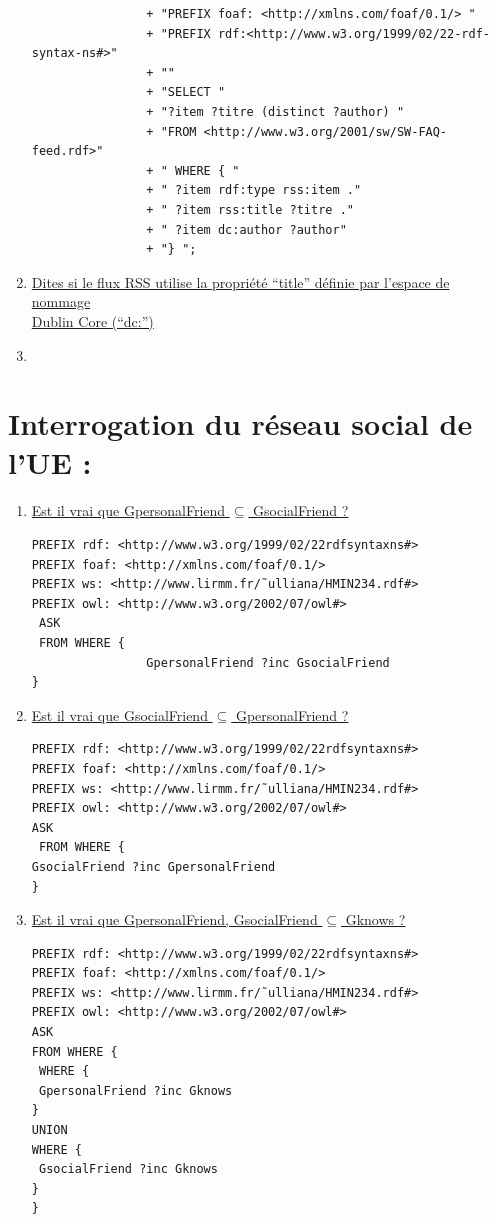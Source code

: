 \documentclass[12pt,a4paper]{article}
\begin{document}
\begin{justify}
\begin{enumerate}
\begin{verbatim}
                + "PREFIX foaf: <http://xmlns.com/foaf/0.1/> "
                + "PREFIX rdf:<http://www.w3.org/1999/02/22-rdf-syntax-ns#>"
                + ""
                + "SELECT "
                + "?item ?titre (distinct ?author) "
                + "FROM <http://www.w3.org/2001/sw/SW-FAQ-feed.rdf>"
                + " WHERE { "
                + " ?item rdf:type rss:item ."
                + " ?item rss:title ?titre ."
                + " ?item dc:author ?author"
                + "} ";
            \end{verbatim}
            \item  \underline{Dites si le flux RSS utilise la propri\'et\'e “title” d\'efinie par l\rq{espace} de nommage}\\ \underline{ Dublin Core (“dc:”)} \\


            \item
        \end{enumerate}
    \end{justify}


    \section{Interrogation du réseau social de l'UE :}
    \begin{justify}
        \begin{enumerate}
            \item \underline{Est il vrai que GpersonalFriend $\subseteq$ GsocialFriend ?}
            \begin{verbatim}
PREFIX rdf: <http://www.w3.org/1999/02/22rdfsyntaxns#>
PREFIX foaf: <http://xmlns.com/foaf/0.1/> 
PREFIX ws: <http://www.lirmm.fr/˜ulliana/HMIN234.rdf#> 
PREFIX owl: <http://www.w3.org/2002/07/owl#>
 ASK
 FROM WHERE {
                GpersonalFriend ?inc GsocialFriend 
}

            \end{verbatim}
            \item \underline{Est il vrai que GsocialFriend $\subseteq$ GpersonalFriend ?}
            \begin{verbatim}
PREFIX rdf: <http://www.w3.org/1999/02/22rdfsyntaxns#>
PREFIX foaf: <http://xmlns.com/foaf/0.1/> 
PREFIX ws: <http://www.lirmm.fr/˜ulliana/HMIN234.rdf#> 
PREFIX owl: <http://www.w3.org/2002/07/owl#>
ASK
 FROM WHERE { 
GsocialFriend ?inc GpersonalFriend 
}
            \end{verbatim}
            \item \underline{Est il vrai que GpersonalFriend, GsocialFriend $\subseteq$ Gknows ?}
            \begin{verbatim}
PREFIX rdf: <http://www.w3.org/1999/02/22rdfsyntaxns#>
PREFIX foaf: <http://xmlns.com/foaf/0.1/>
PREFIX ws: <http://www.lirmm.fr/˜ulliana/HMIN234.rdf#>
PREFIX owl: <http://www.w3.org/2002/07/owl#>
ASK
FROM WHERE {
 WHERE {
 GpersonalFriend ?inc Gknows
}
UNION
WHERE {
 GsocialFriend ?inc Gknows
}
}

            \end{verbatim}
        \end{enumerate}
    \end{justify}
\end{document}
